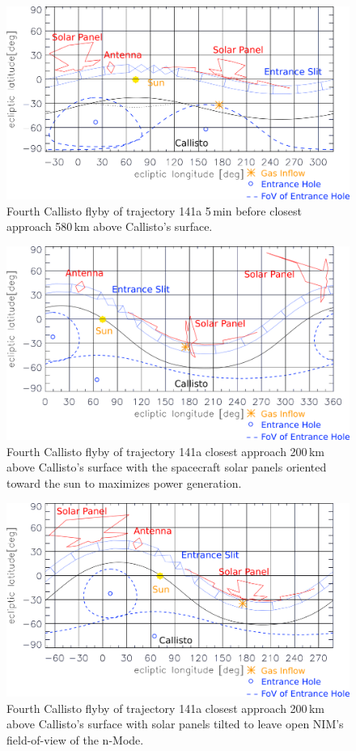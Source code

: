 		\begin{figure}[h!]
			\centering
			\includegraphics[width = .7\textwidth]{Bilder/NIM_pointing_2031JAN15194700.png}
			\caption{Fourth Callisto flyby of trajectory 141a \cite{SOC_Crema3p2} 5\,min before closest approach 580\,km above Callisto's surface.}
			\label{fig:FlybyCal1947}
		\end{figure}
		\begin{figure}[h!]
			\centering
			\includegraphics[width = .7\textwidth]{Bilder/NIM_pointing_2031JAN15195200_tilt.png}
			\caption{Fourth Callisto flyby of trajectory 141a \cite{SOC_Crema3p2} closest approach 200\,km above Callisto's surface with the spacecraft solar panels oriented toward the sun to maximizes power generation.}
			\label{fig:FlybyCal1952sol}
		\end{figure}
		\begin{figure}[h!]
			\centering
			\includegraphics[width = .7\textwidth]{Bilder/NIM_pointing_2031JAN15195200.png}
			\caption{Fourth Callisto flyby of trajectory 141a \cite{SOC_Crema3p2} closest approach 200\,km above Callisto's surface with solar panels tilted to leave open NIM's field-of-view of the n-Mode.}
			\label{fig:FlybyCal1952}
		\end{figure}
